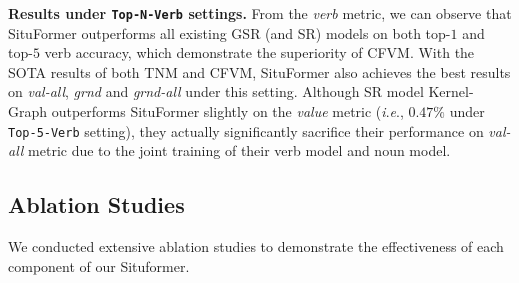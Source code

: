 \documentclass[letterpaper]{article} %
\newcommand{\ie}{\textit{i}.\textit{e}.}
\begin{document}

\noindent\textbf{Results under \texttt{Top-N-Verb} settings.} From the \emph{verb} metric, we can observe that SituFormer outperforms all existing GSR (and SR) models on both top-$1$ and top-$5$ verb accuracy, which demonstrate the superiority of CFVM. With the SOTA results of both TNM and CFVM, SituFormer also achieves the best results on \emph{val-all}, \emph{grnd} and \emph{grnd-all} under this setting. Although SR model Kernel-Graph outperforms SituFormer slightly on the \textit{value} metric (\ie, $0.47\%$ under \texttt{Top-5-Verb} setting), they actually significantly sacrifice their performance on \textit{val-all} metric due to the joint training of their verb model and noun model.




\subsection{Ablation Studies}
We conducted extensive ablation studies to demonstrate the effectiveness of each component of our Situformer.
\end{document}
